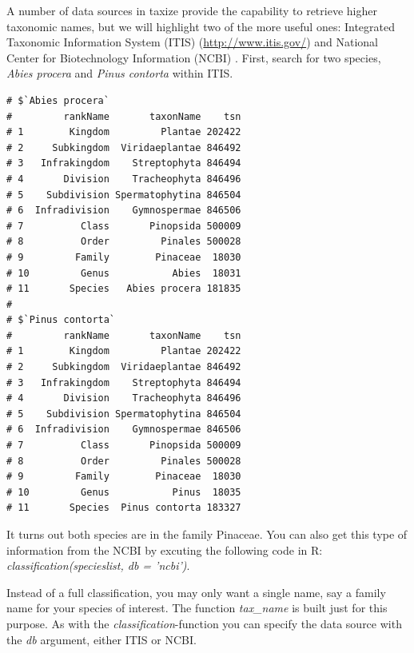 \begin{sloppypar}
A number of data sources in taxize provide the capability to retrieve higher taxonomic names, but we will highlight two of the more useful ones: Integrated Taxonomic Information System (ITIS) (\url{http://www.itis.gov/}) and National Center for Biotechnology Information (NCBI) \citep{federhen2012}.
First, search for two species, \emph{Abies procera} and \emph{Pinus contorta} within ITIS.

\begin{knitrout}
\small
{}
\color{fgcolor}
\begin{kframe}
\begin{alltt}
 \hlkwb{<-} \hlstd{(}\hlstd{,} \hlstd{)}
  \hlstd{=} \hlstd{)}
\end{alltt}
\begin{verbatim}
# $`Abies procera`
#         rankName       taxonName    tsn
# 1        Kingdom         Plantae 202422
# 2     Subkingdom  Viridaeplantae 846492
# 3   Infrakingdom    Streptophyta 846494
# 4       Division    Tracheophyta 846496
# 5    Subdivision Spermatophytina 846504
# 6  Infradivision    Gymnospermae 846506
# 7          Class       Pinopsida 500009
# 8          Order         Pinales 500028
# 9         Family        Pinaceae  18030
# 10         Genus           Abies  18031
# 11       Species   Abies procera 181835
# 
# $`Pinus contorta`
#         rankName       taxonName    tsn
# 1        Kingdom         Plantae 202422
# 2     Subkingdom  Viridaeplantae 846492
# 3   Infrakingdom    Streptophyta 846494
# 4       Division    Tracheophyta 846496
# 5    Subdivision Spermatophytina 846504
# 6  Infradivision    Gymnospermae 846506
# 7          Class       Pinopsida 500009
# 8          Order         Pinales 500028
# 9         Family        Pinaceae  18030
# 10         Genus           Pinus  18035
# 11       Species  Pinus contorta 183327
\end{verbatim}
\end{kframe}
\end{knitrout}

It turns out both species are in the family Pinaceae.
You can also get this type of information from the NCBI by excuting the following code in R: \emph{classification(specieslist, db = 'ncbi')}.

Instead of a full classification, you may only want a single name, say a family name for your species of interest.
The function \emph{tax\_name} is built just for this purpose.
As with the \emph{classification}-function you can specify the data source with the \emph{db} argument, either ITIS or NCBI. 


\end{sloppypar}

